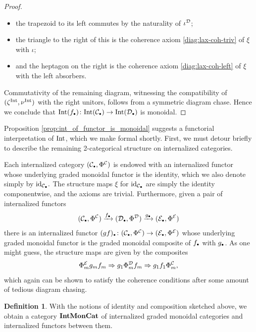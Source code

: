 \documentclass[openany, amssymb, psamsfonts]{amsart}
\theoremstyle{definition}
\newtheorem{defn}{Definition}[section]
\numberwithin{equation}{section}
\begin{document}
\begin{proof}
\begin{itemize}[label=\textendash, noitemsep, topsep=2pt]
    \item the trapezoid to its left commutes by the naturality of $\iota^{\mathcal{D}}$;
    \item the triangle to the right of this is the coherence axiom \eqref{diag:lax-coh-triv} of $\xi$ with $\iota$;
    \item and the heptagon on the right is the coherence axiom \eqref{diag:lax-coh-left} of $\xi$ with the left absorbers.
\end{itemize} Commutativity of the remaining diagram, witnessing the compatibility of $(\zeta^{\mathrm{Int}}, \nu^{\mathrm{Int}})$ with the right unitors, follows from a symmetric diagram chase. Hence we conclude that $\Int(f_\sbull) \colon \Int(\C_\sbull) \to \Int(\D_\sbull)$ is monoidal.
\end{proof}

Proposition \ref{prop:int_of_functor_is_monoidal} suggests a functorial interpretation of $\mathrm{Int}$, which we make formal shortly. First, we must detour briefly to describe the remaining 2-categorical structure on internalized categories.

Each internalized category $(\C_\sbull, \Phi^\C)$ is endowed with an internalized functor whose underlying graded monoidal functor is the identity, which we also denote simply by $\id_{\C_\sbull}.$ The structure maps $\xi$ for $\id_{\C_\sbull}$ are simply the identity componentwise, and the axioms are trivial. Furthermore, given a pair of internalized functors
\begin{equation*}
    (\C_\sbull, \Phi^\C) \xrightarrow{f_\sbull} (\D_\sbull, \Phi^\D) \xrightarrow{g_\sbull} (\E_\sbull, \Phi^\E)
\end{equation*}there is an internalized functor $(gf)_\sbull \colon (\C_\sbull, \Phi^\C) \to (\E_\sbull, \Phi^\E)$ whose underlying graded monoidal functor is the graded monoidal composite of $f_\sbull$ with $g_\sbull$. As one might guess, the structure maps are given by the composites
\begin{equation*}
    \Phi_m^{\mathcal{E}} g_mf_m \Rightarrow g_1\Phi^{\mathcal{D}}_m f_m \Rightarrow g_1f_1\Phi^{\mathcal{C}}_m,
\end{equation*} which again can be shown to satisfy the coherence conditions after some amount of tedious diagram chasing.

\begin{defn}
With the notions of identity and composition sketched above, we obtain a category $\textbf{\textup{IntMonCat}}$ of internalized graded monoidal categories and internalized functors between them.
\end{defn}
\end{document}
